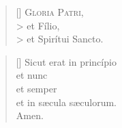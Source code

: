 \documentclass[omni.tex]{subfiles}
\begin{document}
\settowidth{\versewidth}{Et ne nos ind\'ucas in tentati\'onem}

\begin{verse}[\versewidth]
\lettrine[lhang=1.0,nindent=0em]{G}{loria Patri}, \\>
et F\'ilio, \\>
et Spir\'itui Sancto.
\end{verse}

\begin{verse}[\versewidth]
Sicut erat in princ\'ipio \\
et nunc \\
et semper \\
et in s\ae cula s\ae culorum. \\
Amen. \\[7\baselineskip]
\end{verse}

\pagebreak
\end{document}
